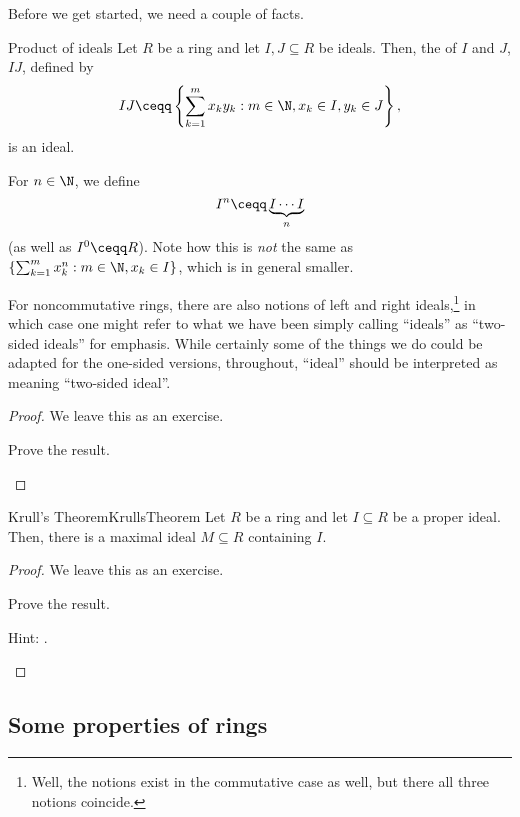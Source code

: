 Before we get started, we need a couple of facts.
\begin{prp}{Product of ideals}{}
	Let $R$ be a ring and let $I,J\subseteq R$ be ideals.  Then, the  of $I$ and $J$, $IJ$, defined by
	\begin{equation}
	IJ\ceqq \left\{ \sum _{k=1}^mx_ky_k:m\in \N ,x_k\in I,y_k\in J\right\} ,
	\end{equation}
	is an ideal.
	\begin{rmk}
		For $n\in \N$, we define
		\begin{equation}
			I^n\ceqq \underbrace{I\cdots I}_n
		\end{equation}
		(as well as $I^0\ceqq R$).  Note how this is \emph{not} the same as $\left\{ \sum _{k=1}^mx_k^n:m\in \N ,x_k\in I\right\}$, which is in general smaller.
	\end{rmk}
	\begin{rmk}
		For noncommutative rings, there are also notions of left and right ideals,\footnote{Well, the notions exist in the commutative case as well, but there all three notions coincide.} in which case one might refer to what we have been simply calling ``ideals'' as ``two-sided ideals'' for emphasis.  While certainly some of the things we do could be adapted for the one-sided versions, throughout, ``ideal'' should be interpreted as meaning ``two-sided ideal''.
	\end{rmk}
	\begin{proof}
		We leave this as an exercise.
		\begin{exr}[breakable=false]{}{}
			Prove the result.
		\end{exr}
	\end{proof}
\end{prp}
\begin{thm}{Krull's Theorem}{KrullsTheorem}
	Let $R$ be a ring and let $I\subseteq R$ be a proper ideal.  Then, there is a maximal ideal $M\subseteq R$ containing $I$.
	\begin{proof}
		We leave this as an exercise.
		\begin{exr}[breakable=false]{}{}
			Prove the result.
			\begin{rmk}
				Hint:  .
			\end{rmk}
		\end{exr}
	\end{proof}
\end{thm}

\subsection{Some properties of rings}\label{sbsC.1.1}

